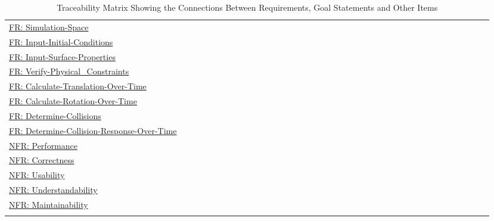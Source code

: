 \documentclass[12pt]{article}
\begin{document}
\begin{longtable}{l l l l l l l l l l l l l l l l l l l l l l l l l l l l l l l l l l l l l l}
\\
\hyperref[simSpace]{FR: Simulation-Space} &  &  &  &  &  &  &  &  &  &  &  &  &  &  &  &  &  &  &  &  &  &  &  &  &  &  &  &  &  &  &  &  &  &  &  &  & 
\\
\hyperref[inputInitialConds]{FR: Input-Initial-Conditions} &  &  &  &  &  &  &  &  &  &  &  &  &  &  &  &  &  &  &  &  &  &  &  &  &  &  &  &  &  &  &  &  &  &  &  &  & 
\\
\hyperref[inputSurfaceProps]{FR: Input-Surface-Properties} &  &  &  &  &  &  &  &  &  &  &  &  &  &  &  &  &  &  &  &  &  &  &  &  &  &  &  &  &  &  &  &  &  &  &  &  & 
\\
\hyperref[verifyPhysCons]{FR: Verify-Physical\_Constraints} &  &  &  &  &  &  &  &  &  &  &  &  &  &  &  &  &  &  &  &  &  &  &  &  &  &  &  &  &  &  &  &  &  &  &  &  & 
\\
\hyperref[calcTransOverTime]{FR: Calculate-Translation-Over-Time} &  &  &  &  &  &  &  &  &  &  &  &  &  &  &  &  &  &  &  &  &  &  &  &  &  &  &  &  &  &  &  &  &  &  &  &  & 
\\
\hyperref[calcRotOverTime]{FR: Calculate-Rotation-Over-Time} &  &  &  &  &  &  &  &  &  &  &  &  &  &  &  &  &  &  &  &  &  &  &  &  &  &  &  &  &  &  &  &  &  &  &  &  & 
\\
\hyperref[deterColls]{FR: Determine-Collisions} &  &  &  &  &  &  &  &  &  &  &  &  &  &  &  &  &  &  &  &  &  &  &  &  &  &  &  &  &  &  &  &  &  &  &  &  & 
\\
\hyperref[deterCollRespOverTime]{FR: Determine-Collision-Response-Over-Time} &  &  &  &  &  &  &  &  &  &  &  &  &  &  &  &  &  &  &  &  &  &  &  &  &  &  &  &  &  &  &  &  &  &  &  &  & 
\\
\hyperref[performance]{NFR: Performance} &  &  &  &  &  &  &  &  &  &  &  &  &  &  &  &  &  &  &  &  &  &  &  &  &  &  &  &  &  &  &  &  &  &  &  &  & 
\\
\hyperref[correctness]{NFR: Correctness} &  &  &  &  &  &  &  &  &  &  &  &  &  &  &  &  &  &  &  &  &  &  &  &  &  &  &  &  &  &  &  &  &  &  &  &  & 
\\
\hyperref[usability]{NFR: Usability} &  &  &  &  &  &  &  &  &  &  &  &  &  &  &  &  &  &  &  &  &  &  &  &  &  &  &  &  &  &  &  &  &  &  &  &  & 
\\
\hyperref[understandability]{NFR: Understandability} &  &  &  &  &  &  &  &  &  &  &  &  &  &  &  &  &  &  &  &  &  &  &  &  &  &  &  &  &  &  &  &  &  &  &  &  & 
\\
\hyperref[maintainability]{NFR: Maintainability} &  &  &  &  &  &  &  &  &  &  &  &  &  &  &  &  &  &  &  &  &  &  &  &  &  &  &  &  &  &  &  &  &  &  &  &  & 
\\
\bottomrule
\caption{Traceability Matrix Showing the Connections Between Requirements, Goal Statements and Other Items}
\label{Table:TraceMatAllvsR}
\end{longtable}
\end{document}
